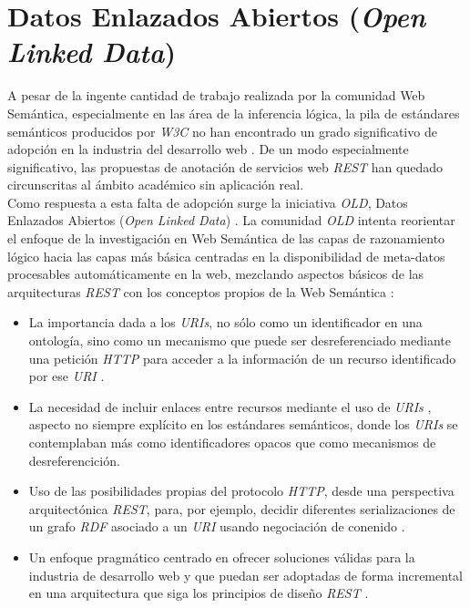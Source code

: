 \section{Datos Enlazados Abiertos (\textit{Open Linked Data})}

A pesar de la ingente cantidad de trabajo realizada por la comunidad Web Sem\'antica, especialmente en las \'area de la inferencia l\'ogica, la pila de est\'andares sem\'anticos producidos por \textit{W3C} no han encontrado un grado significativo de adopci\'on en la industria del desarrollo web \cite{pedantic}. De un modo especialmente significativo, las propuestas de anotaci\'on de servicios web \textit{REST} han quedado circunscritas al \'ambito acad\'emico sin aplicaci\'on real.\\
Como respuesta a esta falta de adopci\'on surge la iniciativa \textit{OLD}, Datos Enlazados Abiertos (\textit{Open Linked Data}) \cite{old_story}. La comunidad \textit{OLD} intenta reorientar el enfoque de la investigaci\'on en Web Sem\'antica de las capas de razonamiento l\'ogico hacia las capas m\'as b\'asica centradas en la disponibilidad de meta-datos procesables autom\'aticamente en la web, mezclando aspectos b\'asicos de las arquitecturas \textit{REST} con los conceptos propios de la Web Sem\'antica \cite{page2011rest}:

\begin{itemize}

\item La importancia dada a los \textit{URIs}, no s\'olo como un identificador en una ontolog\'ia, sino como un mecanismo que puede ser desreferenciado mediante una petici\'on \textit{HTTP} para acceder a la informaci\'on de un recurso identificado por ese \textit{URI} \cite{sauermann2011cool}.

\item La necesidad de incluir enlaces entre recursos mediante el uso de \textit{URIs} \cite{hausenblas2009exploiting}, aspecto no siempre expl\'icito en los est\'andares sem\'anticos, donde los \textit{URIs} se contemplaban m\'as como identificadores opacos que como mecanismos de desreferencici\'on.

\item Uso de las posibilidades propias del protocolo \textit{HTTP}, desde una perspectiva arquitect\'onica \textit{REST}, para, por ejemplo, decidir diferentes serializaciones de un grafo \textit{RDF} asociado a un \textit{URI} usando negociaci\'on de conenido \cite{bizer2007publish}.

\item Un enfoque pragm\'atico centrado en ofrecer soluciones v\'alidas para la industria de desarrollo web y que puedan ser adoptadas de forma incremental en una arquitectura que siga los principios de dise\~no \textit{REST} \cite{heath2011linked}.

\end{itemize}

